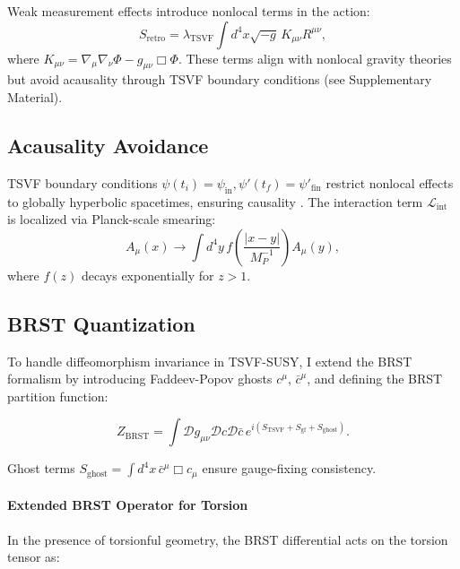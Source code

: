 \documentclass[twocolumn,superscriptaddress,floatfix]{revtex4-2}
\begin{document}
Weak measurement effects \cite{Aharonov2008} introduce nonlocal terms in the action:  
\begin{equation}  
S_{\text{retro}} = \lambda_{\text{TSVF}} \int d^4x\sqrt{-g} \, K_{\mu\nu}R^{\mu\nu},  
\label{eq:retro_action}  
\end{equation}  
where \( K_{\mu\nu} = \nabla_\mu\nabla_\nu\Phi - g_{\mu\nu}\Box\Phi \). These terms align with nonlocal gravity theories \cite{Barvinsky2009} but avoid acausality through TSVF boundary conditions (see Supplementary Material).  

\subsection{Acausality Avoidance}  
\label{subsec:acausality}  
TSVF boundary conditions $\psi(t_i) = \psi_{\text{in}}, \psi'(t_f) = \psi'_{\text{fin}}$ restrict nonlocal effects to globally hyperbolic spacetimes, ensuring causality \cite{Wharton2016}. The interaction term $\mathcal{L}_{\text{int}}$ is localized via Planck-scale smearing:  
\begin{equation}  
A_\mu(x) \to \int d^4y \, f\left(\frac{|x-y|}{M_P^{-1}}\right) A_\mu(y),  
\end{equation}  
where $f(z)$ decays exponentially for $z > 1$.  

\subsection{BRST Quantization}  
\label{subsec:brst}  

To handle diffeomorphism invariance in TSVF-SUSY, I extend the BRST formalism by introducing Faddeev-Popov ghosts \( c^\mu \), \( \bar{c}^\mu \), and defining the BRST partition function:

\begin{equation}
Z_{\text{BRST}} = \int \mathcal{D}g_{\mu\nu} \mathcal{D}c \mathcal{D}\bar{c} \, e^{i\left(S_{\text{TSVF}} + S_{\text{gf}} + S_{\text{ghost}}\right)}.
\label{eq:brst}
\end{equation}

Ghost terms \( S_{\text{ghost}} = \int d^4x \, \bar{c}^\mu \Box c_\mu \) ensure gauge-fixing consistency.

\paragraph{Extended BRST Operator for Torsion}
In the presence of torsionful geometry, the BRST differential acts on the torsion tensor as:
\end{document}
